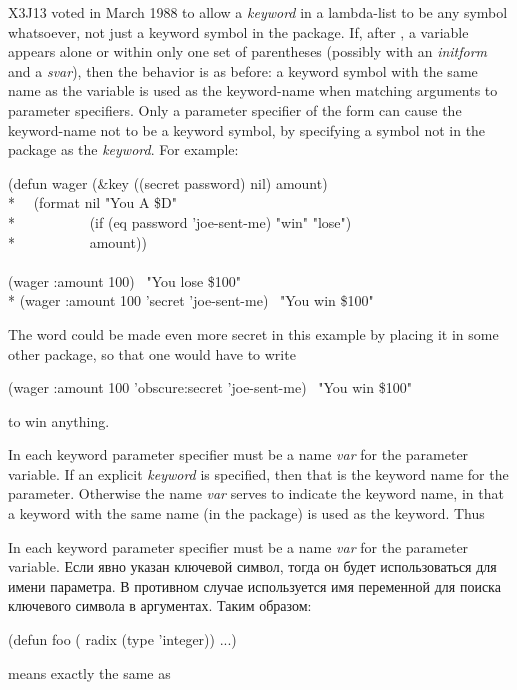 \begin{newer}
X3J13 voted in March 1988 
to allow a \textit{keyword} in a lambda-list
to be any symbol whatsoever, not just a keyword symbol
in the  package.  If, after ,
a variable appears alone or within only one set of parentheses
(possibly with an \textit{initform} and a \textit{svar}), then
the behavior is as before: a keyword symbol with the same name as
the variable is used as the keyword-name when matching arguments
to parameter specifiers.  Only a parameter specifier of the form
 can cause the keyword-name
not to be a keyword symbol, by specifying a symbol not in the 
package as the \textit{keyword}.
For example:
\begin{lisp}
(defun wager (\&key ((secret password) nil) amount) \\*
~~(format nil "You {\Xtilde}A \${\Xtilde}D" \\*
~~~~~~~~~~(if (eq password 'joe-sent-me) "win" "lose") \\*
~~~~~~~~~~amount)) \\
\\
(wager :amount 100) \EV\ "You lose \$100" \\*
(wager :amount 100 'secret 'joe-sent-me) \EV\ "You win \$100"
\end{lisp}
The  word could be made even more secret in this example
by placing it in some other  package, so that one would
have to write
\begin{lisp}
(wager :amount 100 'obscure:secret 'joe-sent-me) \EV\ "You win \$100"
\end{lisp}
to win anything.
\end{newer}

In each keyword parameter specifier must be a name \textit{var} for the
parameter variable.  If an explicit \textit{keyword} is
specified, then that is the keyword name for the parameter.  Otherwise
the name \textit{var} serves to indicate the keyword name,
in that a keyword with the same name (in the  package) is used
as the keyword.  Thus

In each keyword parameter specifier must be a name \textit{var} for the
parameter variable.
Если явно указан ключевой символ, тогда он будет использоваться для имени
параметра. В противном случае используется имя переменной  для поиска
ключевого символа в аргументах. Таким образом:

\begin{lisp}
(defun foo ( radix (type 'integer)) ...)
\end{lisp}
means exactly the same as

